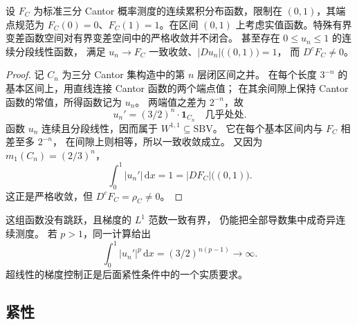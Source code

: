 \begin{proposition}\label{b1:prop:sbv-not-strictly-closed}
设 \(F_C\) 为标准三分 Cantor 概率测度的连续累积分布函数，限制在 \((0,1)\)，其端点规范为 \(F_C(0)=0\)、\(F_C(1)=1\)。在区间 \((0,1)\) 上考虑实值函数。特殊有界变差函数空间对有界变差空间中的严格收敛并不闭合。
甚至存在 \(0\le u_n\le1\) 的连续分段线性函数，
满足 \(u_n\to F_C\) 一致收敛、\(|Du_n|\bigl((0,1)\bigr)=1\)，
而 \(D^cF_C\ne0\)。
\end{proposition}
\begin{proof}
记 \(C_n\) 为三分 Cantor 集构造中的第 \(n\) 层闭区间之并。
在每个长度 \(3^{-n}\) 的基本区间上，用直线连接 Cantor 函数的两个端点值；
在其余间隙上保持 Cantor 函数的常值，所得函数记为 \(u_n\)。
两端值之差为 \(2^{-n}\)，故
\[
 u_n'=(3/2)^n\cdot\mathbf1_{C_n}\quad\text{几乎处处}.
\]
函数 \(u_n\) 连续且分段线性，因而属于 \(W^{1,1}\subseteq \mathrm{SBV}\)。
它在每个基本区间内与 \(F_C\) 相差至多 \(2^{-n}\)，
在间隙上则相等，所以一致收敛成立。
又因为 \(m_1(C_n)=(2/3)^n\)，
\[
 \int_0^1|u_n'|\,\mathrm dx=1=|DF_C|\bigl((0,1)\bigr).
\]
这正是严格收敛，但 \(D^cF_C=\rho_C\ne0\)。
\end{proof}

这组函数没有跳跃，且梯度的 \(L^1\) 范数一致有界，
仍能把全部导数集中成奇异连续测度。
若 \(p>1\)，同一计算给出
\[
 \int_0^1|u_n'|^p\,\mathrm dx=(3/2)^{n(p-1)}\longrightarrow\infty.
\]
超线性的梯度控制正是后面紧性条件中的一个实质要求。

\subsection{紧性}
\label{b1:subsec:280403}

